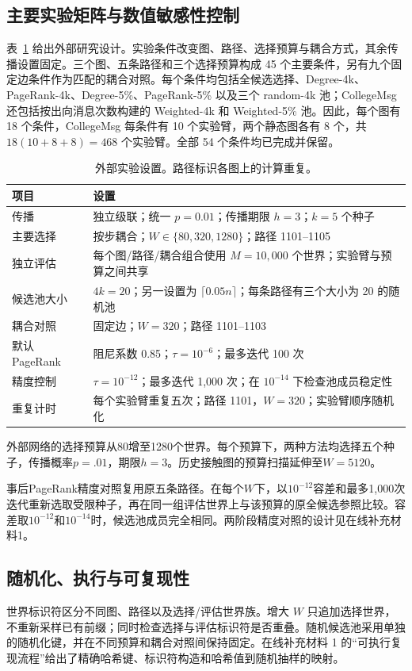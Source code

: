 \documentclass[smallextended]{svjour3}
\begin{document}
\subsection{主要实验矩阵与数值敏感性控制}
表~\ref{tab:settings} 给出外部研究设计。实验条件改变图、路径、选择预算与耦合方式，其余传播设置固定。三个图、五条路径和三个选择预算构成 45 个主要条件，另有九个固定边条件作为匹配的耦合对照。每个条件均包括全候选选择、Degree-4k、PageRank-4k、Degree-5\%、PageRank-5\% 以及三个 random-4k 池；CollegeMsg 还包括按出向消息次数构建的 Weighted-4k 和 Weighted-5\% 池。因此，每个图有 18 个条件，CollegeMsg 每条件有 10 个实验臂，两个静态图各有 8 个，共 $18(10+8+8)=468$ 个实验臂。全部 54 个条件均已完成并保留。

\begin{table}[htbp]
\caption{外部实验设置。路径标识各图上的计算重复。}\label{tab:settings}
\begin{tabularx}{\linewidth}{lX}
\toprule
项目 & 设置 \\
\midrule
传播 & 独立级联；统一 $p=0.01$；传播期限 $h=3$；$k=5$ 个种子 \\
主要选择 & 按步耦合；$W\in\{80,320,1280\}$；路径 1101--1105 \\
独立评估 & 每个图/路径/耦合组合使用 $M=10,000$ 个世界；实验臂与预算之间共享 \\
候选池大小 & $4k=20$；另一设置为 $\lceil0.05n\rceil$；每条路径有三个大小为 20 的随机池 \\
耦合对照 & 固定边；$W=320$；路径 1101--1103 \\
默认 PageRank & 阻尼系数 0.85；$\tau=10^{-6}$；最多迭代 100 次 \\
精度控制 & $\tau=10^{-12}$；最多迭代 1,000 次；在 $10^{-14}$ 下检查池成员稳定性 \\
重复计时 & 每个实验臂重复五次；路径 1101，$W=320$；实验臂顺序随机化 \\
\bottomrule
\end{tabularx}
\end{table}

外部网络的选择预算从80增至1280个世界。每个预算下，两种方法均选择五个种子，传播概率$p=.01$，期限$h=3$。历史接触图的预算扫描延伸至$W=5120$。

事后PageRank精度对照复用原五条路径。在每个$W$下，以$10^{-12}$容差和最多1,000次迭代重新选取受限种子，再在同一组评估世界上与该预算的原全候选参照比较。容差取$10^{-12}$和$10^{-14}$时，候选池成员完全相同。两阶段精度对照的设计见在线补充材料1。

\subsection{随机化、执行与可复现性}
世界标识符区分不同图、路径以及选择/评估世界族。增大 $W$ 只追加选择世界，不重新采样已有前缀；同时检查选择与评估标识符是否重叠。随机候选池采用单独的随机化键，并在不同预算和耦合对照间保持固定。在线补充材料 1 的“可执行复现流程”给出了精确哈希键、标识符构造和哈希值到随机抽样的映射。
\end{document}
